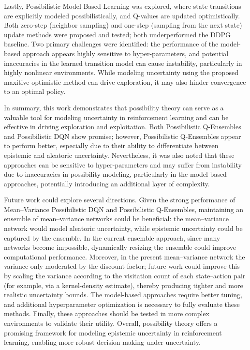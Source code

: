 \documentclass[11pt,a4paper]{report}
\begin{document}
Lastly, Possibilistic Model-Based Learning was explored, where state transitions are explicitly modeled possibilistically, and Q-values are updated optimistically. Both zero-step (neighbor sampling) and one-step (sampling from the next state) update methods were proposed and tested; both underperformed the DDPG baseline. Two primary challenges were identified: the performance of the model-based approach appears highly sensitive to hyper-parameters, and potential inaccuracies in the learned transition model can cause instability, particularly in highly nonlinear environments. While modeling uncertainty using the proposed maxitive optimistic method can drive exploration, it may also hinder convergence to an optimal policy.

In summary, this work demonstrates that possibility theory can serve as a valuable tool for modeling uncertainty in reinforcement learning and can be effective in driving exploration and exploitation. Both Possibilistic Q-Ensembles and Possibilistic DQN show promise; however, Possibilistic Q-Ensembles appear to perform better, especially due to their ability to differentiate between epistemic and aleatoric uncertainty. Nevertheless, it was also noted that these approaches can be sensitive to hyper-parameters and may suffer from instability due to inaccuracies in possibility modeling, particularly in the model-based approaches, potentially introducing an additional layer of complexity.

Future work could explore several directions. Given the strong performance of Mean–Variance Possibilistic DQN and Possibilistic Q-Ensembles, maintaining an ensemble of mean–variance networks could be beneficial: the mean–variance network would model aleatoric uncertainty, while epistemic uncertainty could be captured by the ensemble. In the current ensemble approach, since many networks become impossible, dynamically resizing the ensemble could improve computational performance. Moreover, in the present mean–variance network the variance only moderated by the discount factor; future work could improve this by scaling the variance according to the visitation count of each state–action pair (for example, via a kernel-density estimate), thereby producing tighter and more realistic uncertainty bounds. The model-based approaches require better tuning, and additional hyperparameter optimization is necessary to fully evaluate these methods. Finally, these approaches should be tested in more complex environments to validate their utility. Overall, possibility theory offers a promising framework for modeling epistemic uncertainty in reinforcement learning, enabling more robust decision-making under uncertainty.
\end{document}
